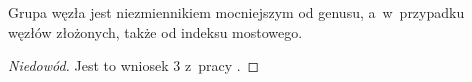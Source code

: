 \begin{proposition}
    Grupa węzła jest niezmiennikiem mocniejszym od genusu, a~w~przypadku węzłów złożonych, także od indeksu mostowego.
\end{proposition}

\begin{proof}[Niedowód]
    Jest to wniosek 3 z~pracy \cite{feustel78}.
\end{proof}





